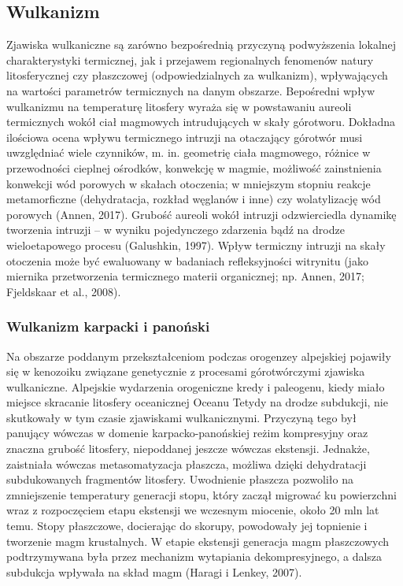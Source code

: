 \documentclass[11.5pt,twoside]{report}
\begin{document}
	
	\subsection{Wulkanizm}
	
Zjawiska wulkaniczne są zarówno bezpośrednią przyczyną podwyższenia lokalnej charakterystyki termicznej, jak i przejawem regionalnych fenomenów natury litosferycznej czy płaszczowej (odpowiedzialnych za wulkanizm), wpływających na wartości parametrów termicznych na danym obszarze. Bepośredni wpływ wulkanizmu na temperaturę litosfery wyraża się w powstawaniu aureoli termicznych wokół ciał magmowych intrudujących w skały górotworu. Dokładna ilościowa ocena wpływu termicznego intruzji na otaczający górotwór musi uwzględniać wiele czynników, m. in. geometrię ciała magmowego, różnice w przewodności cieplnej ośrodków, konwekcję w magmie, możliwość zainstnienia konwekcji wód porowych w skałach otoczenia; w mniejszym stopniu reakcje metamorficzne (dehydratacja, rozkład węglanów i inne) czy wolatylizację wód porowych (Annen, 2017). Grubość aureoli wokół intruzji odzwierciedla dynamikę tworzenia intruzji -- w wyniku pojedynczego zdarzenia bąd\'{z} na drodze wieloetapowego procesu (Galushkin, 1997). Wpływ termiczny intruzji na skały otoczenia może być ewaluowany w badaniach refleksyjności witrynitu (jako miernika przetworzenia termicznego materii organicznej; np. Annen, 2017; Fjeldskaar et al., 2008). 

	\subsubsection{Wulkanizm karpacki i panoński}

Na obszarze poddanym przekształceniom podczas orogenzey alpejskiej pojawiły się w kenozoiku związane genetycznie z procesami górotwórczymi zjawiska wulkaniczne. Alpejskie wydarzenia orogeniczne kredy i paleogenu, kiedy miało miejsce skracanie litosfery oceanicznej Oceanu Tetydy na drodze subdukcji, nie skutkowały w tym czasie zjawiskami wulkanicznymi. Przyczyną tego był panujący wówczas w domenie karpacko-panońskiej reżim kompresyjny oraz znaczna grubość litosfery, niepoddanej jeszcze wówczas ekstensji. Jednakże, zaistniała wówczas metasomatyzacja płaszcza, możliwa dzięki dehydratacji subdukowanych fragmentów litosfery. Uwodnienie płaszcza pozwoliło na zmniejszenie temperatury generacji stopu, który zaczął migrować ku powierzchni wraz z rozpoczęciem etapu ekstensji we wczesnym miocenie, około 20 mln lat temu. Stopy płaszczowe, docierając do skorupy, powodowały jej topnienie i tworzenie magm krustalnych. W etapie ekstensji generacja magm płaszczowych podtrzymywana była przez mechanizm wytapiania dekompresyjnego, a dalsza subdukcja wpływała na skład magm (Haragi i Lenkey, 2007).
\end{document}
